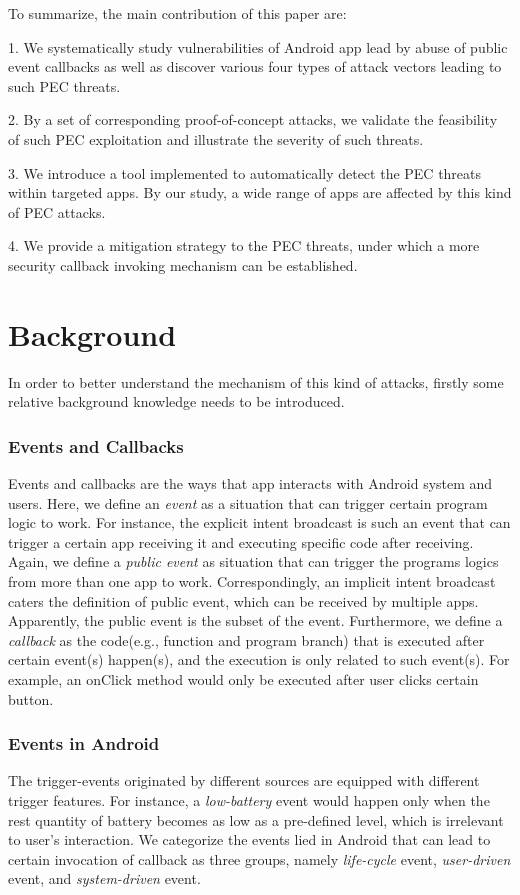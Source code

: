 \documentclass{sig-alternate-05-2015}
\begin{document}
To summarize, the main contribution of this paper are:

1. We systematically study vulnerabilities of Android app lead by abuse of public event callbacks as well as discover various {\color{red}four} types of attack vectors leading to such PEC threats. 
 
2. By a set of corresponding proof-of-concept attacks, we validate the feasibility of such PEC exploitation and illustrate the severity of such threats. 

3. We introduce a tool implemented to automatically detect the PEC threats within targeted apps. By our study, a wide range of apps are affected by this kind of PEC attacks.

4. We provide a mitigation strategy to the PEC threats, under which a more security callback invoking mechanism can be established.

\section{Background}
In order to better understand the mechanism of this kind of attacks, firstly some relative background knowledge needs to be introduced.

\subsubsection{Events and Callbacks}
Events and callbacks are the ways that app interacts with Android system and users. Here, we define an \textit{event} as a situation that can trigger certain program logic to work. For instance, the explicit intent broadcast is such an event that can trigger a certain app receiving it and executing specific code after receiving.
Again, we define a \textit{public event} as situation that can trigger the programs logics from more than one app to work. Correspondingly, an implicit intent broadcast caters the definition of public event, which can be received by multiple apps. Apparently, the public event is the subset of the event.
Furthermore, we define a \textit{callback} as the code(e.g., function and program branch) that is executed after certain event(s) happen(s), and the execution is only related to such event(s). For example, an onClick method would only be executed after user clicks certain button. 

\subsubsection{Events in Android}
The trigger-events originated by different sources are equipped with different trigger features. For instance, a \textit{low-battery} event would happen only when the rest quantity of battery becomes as low as a pre-defined level, which is irrelevant to user's interaction. We categorize the events lied in Android that can lead to certain invocation of callback as three groups, namely \textit{life-cycle} event, \textit{user-driven} event, and \textit{system-driven} event.
\end{document}
